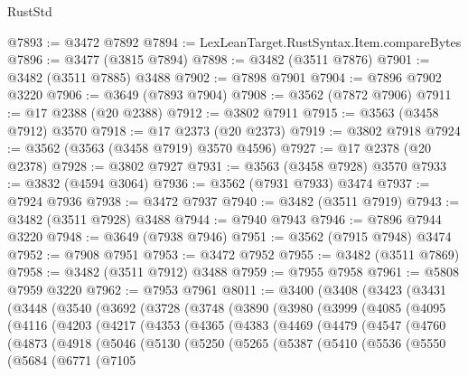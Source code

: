 \begin{lexlean}{RustStd}
\begin{coremodule}
{\begin{coremodule}
{{{{{{{{{{{{{{{{{{{{{{{{{{{{{{{{{{{{{{{{{{{{{@7893 := @3472 @7892
@7894 := LexLeanTarget.RustSyntax.Item.compareBytes
@7896 := @3477 (@3815 @7894)
@7898 := @3482 (@3511 @7876)
@7901 := @3482 (@3511 @7885) @3488
@7902 := @7898 @7901
@7904 := @7896 @7902 @3220
@7906 := @3649 (@7893 @7904)
@7908 := @3562 (@7872 @7906)
@7911 := @17 @2388 (@20 @2388)
@7912 := @3802 @7911
@7915 := @3563 (@3458 @7912) @3570
@7918 := @17 @2373 (@20 @2373)
@7919 := @3802 @7918
@7924 := @3562 (@3563 (@3458 @7919) @3570 @4596)
@7927 := @17 @2378 (@20 @2378)
@7928 := @3802 @7927
@7931 := @3563 (@3458 @7928) @3570
@7933 := @3832 (@4594 @3064)
@7936 := @3562 (@7931 @7933) @3474
@7937 := @7924 @7936
@7938 := @3472 @7937
@7940 := @3482 (@3511 @7919)
@7943 := @3482 (@3511 @7928) @3488
@7944 := @7940 @7943
@7946 := @7896 @7944 @3220
@7948 := @3649 (@7938 @7946)
@7951 := @3562 (@7915 @7948) @3474
@7952 := @7908 @7951
@7953 := @3472 @7952
@7955 := @3482 (@3511 @7869)
@7958 := @3482 (@3511 @7912) @3488
@7959 := @7955 @7958
@7961 := @5808 @7959 @3220
@7962 := @7953 @7961
@8011 := @3400
    (@3408
      (@3423
        (@3431
          (@3448
            (@3540
              (@3692
                (@3728
                  (@3748
                    (@3890
                      (@3980
                        (@3999
                          (@4085
                            (@4095
                              (@4116
                                (@4203
                                  (@4217
                                    (@4353
                                      (@4365
                                        (@4383
                                          (@4469
                                            (@4479
                                              (@4547
                                                (@4760
                                                  (@4873
                                                    (@4918
                                                      (@5046
                                                        (@5130
                                                          (@5250
                                                            (@5265
                                                              (@5387
                                                                (@5410
                                                                  (@5536
                                                                    (@5550
                                                                      (@5684
                                                                        (@6771
                                                                          (@7105
}}}}}}}}}}}}}}}}}}}}}}}}}}}}}}}}}}}}}}}}}}}}}
\end{coremodule}}
\end{coremodule}
\end{lexlean}
